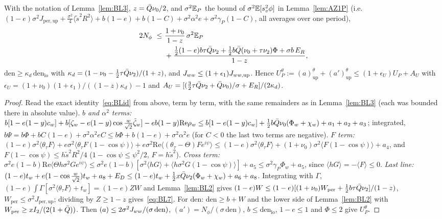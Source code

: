 \begin{lemma} \proofst
\label{lem:BL7}
With the notation of Lemma~\ref{lem:BL3}, $z=\bar Q\nu_0/2$, and $\sigma^2\mathbb{E}_P$ the bound of $\sigma^2\mathbb{E}[s_v^2\phi]$ in Lemma~\ref{lem:AZ1P}
(i.e.\ $(1-e)\sigma^2J_{\mathrm{per,up}}+\frac{\sigma^2}4\langle\tilde s^2R^2\rangle+b(1-e)+b(1-C)+\sigma^2\alpha^2e+\sigma^2\gamma_P(1-C)$, all averages over one period),
\begin{equation}
\begin{aligned}
2N_\phi\ \le\ &\frac{1+\nu_0}{1-z}\,\sigma^2\mathbb{E}_P\\
&+\frac{\frac12(1-e)b\tau\bar Q\nu_2+\frac12b\bar Q(\nu_0+\tau\nu_2)\Phi+\sigma b\,E_R}{1-z},
\end{aligned}
\label{eq:BL7}
\end{equation}
$\mathrm{den}\ge\kappa_d\,\mathrm{den}_{\mathrm{lo}}$ with $\kappa_d=(1-\nu_0-\frac12\tau\bar Q\nu_2)/(1+z)$, and $J_{ww}\le(1+\epsilon_1)J_{ww,\mathrm{up}}$. Hence
$U_P^\theta:=(a)_{\mathrm{up}}^\theta+(a')_{\mathrm{up}}^\theta\le(1+\epsilon_U)U_P+A_U$ with
$\epsilon_U=(1+\nu_0)(1+\epsilon_1)/((1-z)\kappa_d)-1$ and $A_U=[(\frac32\tau\bar Q\nu_2+\bar Q\nu_0)/\sigma+E_R]/(2\kappa_d)$.
\end{lemma}
\begin{proof}
Read the exact identity~\eqref{eq:BLid} from above, term by term, with the same remainders as in Lemma~\ref{lem:BL3} (each was bounded there in absolute value).
\emph{$b$ and $\alpha^2$ terms:} $b[1-e(1-y)c_w]+b[\zeta_w-e(1-y)\cos\frac w{\sqrt2}\tilde\zeta_w]-eb(1-y)\mathrm{Re}\rho_w\le b[1-e(1-y)c_w]+\frac12b\bar Q\nu_0(\Phi_w+\chi_w)+a_1+a_2+a_3$;
integrated, $b\Psi=b\Phi+bC(1-e)+\sigma^2\alpha^2eC\le b\Phi+b(1-e)+\sigma^2\alpha^2e$ (for $C<0$ the last two terms are negative).
\emph{$F$ term:} $(1-e)\sigma^2\langle\theta_\tau F\rangle+e\sigma^2\langle\theta_\tau F(1-\cos\psi)\rangle+e\sigma^2\mathrm{Re}\langle(\theta_\tau-\Theta)Fe^{i\psi}\rangle
\le(1-e)\sigma^2\langle\theta_\tau F\rangle+(1+\nu_0)\sigma^2\langle F(1-\cos\psi)\rangle+a_4$, and $F(1-\cos\psi)\le h\tilde s^2R^2/4$ ($1-\cos\psi\le\psi^2/2$, $F=h\tilde s^2$).
\emph{Cross term:} $\sigma^2e(1-b)\mathrm{Re}\langle\Theta h\sigma^2Ge^{i\psi}\rangle\le\sigma^2e(1-b)[\sigma^2\langle hG\rangle+\langle h\sigma^2G(1-\cos\psi)\rangle]+a_5
\le\sigma^2\gamma_P\Phi_w+a_5$, since $\langle hG\rangle=-\langle F\rangle\le0$.
\emph{Last line:} $(1-e)t_w+e(1-\cos\frac w{\sqrt2})t_w+a_8+E_D\le(1-e)t_w+\frac12x\bar Q\nu_2(\Phi_w+\chi_w)+a_6+a_8$.
Integrating with $\Gamma$, $(1-e)\int\Gamma[\sigma^2\langle\theta_\tau F\rangle+t_w]=(1-e)ZW$ and Lemma~\ref{lem:BL2} gives
$(1-e)W\le(1-e)[(1+\nu_0)W_{\mathrm{per}}+\frac12b\tau\bar Q\nu_2]/(1-z)$, $W_{\mathrm{per}}\le\sigma^2J_{\mathrm{per,up}}$; dividing by $Z\ge1-z$ gives~\eqref{eq:BL7}.
For $\mathrm{den}$: $\mathrm{den}\ge b+W$ and the lower side of Lemma~\ref{lem:BL2} with $W_{\mathrm{per}}\ge xI_2/(2(1+\bar Q))$. Then $(a)\le2\sigma^2J_{ww}/(\sigma\,\mathrm{den})$,
$(a')=N_\phi/(\sigma\,\mathrm{den})$, $b\le\mathrm{den}_{\mathrm{lo}}$, $1-e\le1$ and $\Phi\le2$ give $U_P^\theta$.
\end{proof}

